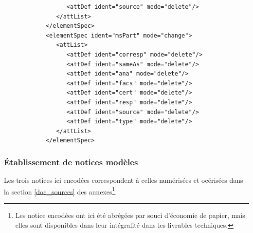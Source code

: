 \documentclass[a4paper,12pt,twoside]{book}
\begin{document}
\begin{verbatim}
                  <attDef ident="source" mode="delete"/>
               </attList>
            </elementSpec>
            <elementSpec ident="msPart" mode="change">
               <attList>
                  <attDef ident="corresp" mode="delete"/>
                  <attDef ident="sameAs" mode="delete"/>
                  <attDef ident="ana" mode="delete"/>
                  <attDef ident="facs" mode="delete"/>
                  <attDef ident="cert" mode="delete"/>
                  <attDef ident="resp" mode="delete"/>
                  <attDef ident="source" mode="delete"/>
                  <attDef ident="type" mode="delete"/>
               </attList>
            </elementSpec>
	\end{verbatim}
	
	\subsubsection{\label{notices_modeles}Établissement de notices modèles}
	
	Les trois notices ici encodées correspondent à celles numérisées et océrisées dans la section \ref{doc_sources} des annexes\footnote{Les notice encodées ont ici été abrégées par souci d'économie de papier, mais elles sont disponibles dans leur intégralité dans les livrables techniques.}. 
	
\end{document}

